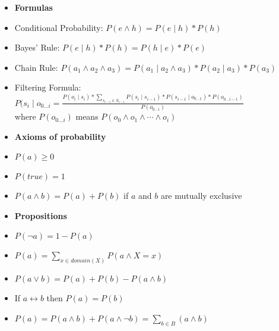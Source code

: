 \documentclass[11pt,landscape]{memoir}
\begin{document}
\begin{itemize}
    \item \textbf{Formulas}
    \item Conditional Probability: $P(e \land h) = P(e \mid h) * P(h)$
    \item Bayes' Rule: $P(e \mid h) * P(h) = P(h \mid e) * P(e)$
    \item Chain Rule: $P(a_1 \land a_2 \land a_3) = P(a_1 \mid a_2 \land a_3) * P(a_2 \mid a_3) * P(a_3)$
    \item Filtering Formula: $P(s_i \mid o_{0 \ldots i} = \frac{P(o_i \mid s_i) * \sum_{s_{i-1} \in S_{i-1}} P(s_i \mid s_{i-1}) * P(s_{i-1} \mid o_{0 \ldots 1}) * P(o_{0 \ldots i-1})}{P(o_{0 \ldots i})}$ \\
        where $P(o_{0 \ldots i})$ means $P(o_0 \land o_1 \land \cdots \land o_i)$
\end{itemize}

\begin{itemize}
    \item \textbf{Axioms of probability}
    \item $P(a) \ge 0$
    \item $P(true) = 1$
    \item $P(a \land b) = P(a) + P(b)$ if $a$ and $b$ are mutually exclusive
\end{itemize}

\begin{itemize}
    \item \textbf{Propositions}
    \item $P(\lnot a) = 1 - P(a)$
    \item $P(a) = \sum_{x \in domain(X)} P(a \land X = x)$
    \item $P(a \lor b) = P(a) + P(b) - P(a \land b)$
    \item If $a \leftrightarrow b$ then $P(a) = P(b)$
    \item $P(a) = P(a \land b) + P(a \land \lnot b) = \sum_{b \in B}(a \land b)$
\end{itemize}
\end{document}

